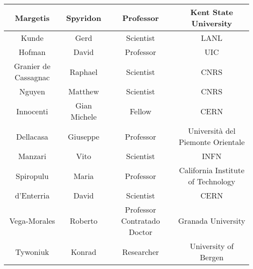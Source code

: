 \begin{table}[h]
\begin{tabular}{ | c | c | c | c | }
    Margetis & Spyridon & Professor & Kent State University \\ \hline
    Kunde & Gerd & Scientist & LANL \\ \hline
    Hofman & David & Professor & UIC \\ \hline
    Granier de Cassagnac & Raphael & Scientist & CNRS\\ \hline
    Nguyen & Matthew & Scientist & CNRS\\ \hline
    Innocenti & Gian Michele & Fellow & CERN\\ \hline
    Dellacasa & Giuseppe & Professor & Universit\`{a} del Piemonte Orientale\\ \hline
    Manzari & Vito & Scientist & INFN\\ \hline

    Spiropulu & Maria & Professor & California Institute of Technology \\ \hline
    d'Enterria & David & Scientist & CERN \\ \hline
    Vega-Morales & Roberto & Professor Contratado Doctor & Granada University \\ \hline
    Tywoniuk & Konrad & Researcher & University of Bergen \\ \hline
  \end{tabular}
\end{table}

